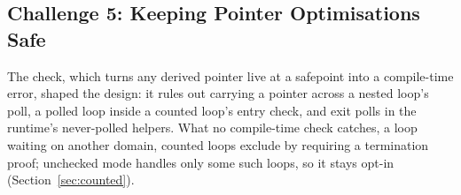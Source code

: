\subsection{Challenge 5: Keeping Pointer Optimisations Safe}
The  check, which turns any derived pointer live at a
safepoint into a compile-time error, shaped the design: it rules out carrying
a pointer across a nested loop's poll, a polled loop inside a counted loop's
entry check, and exit polls in the runtime's never-polled helpers. What no
compile-time check catches, a loop waiting on another domain, counted loops
exclude by requiring a termination proof; unchecked mode handles only some
such loops, so it stays opt-in (Section~\ref{sec:counted}).
